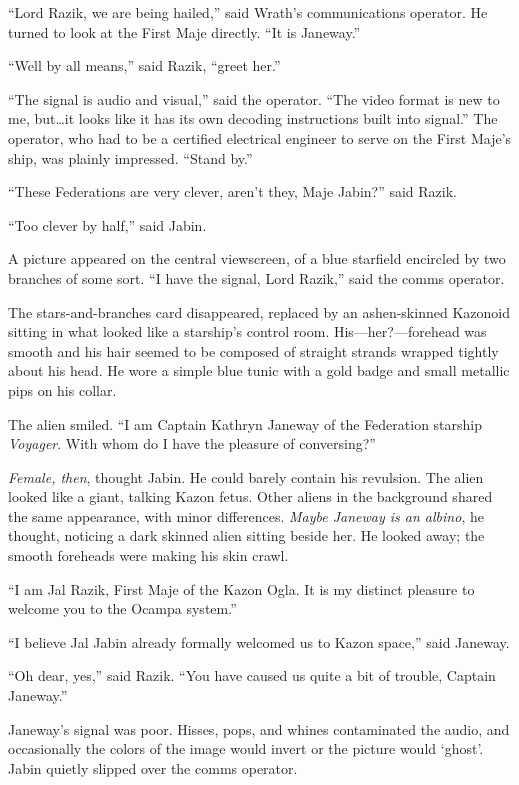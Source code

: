 \documentclass[twoside,letterpaper,12pt]{memoir}
\begin{document}
``Lord Razik, we are being hailed,'' said Wrath's communications operator. He turned to look at the First Maje directly. ``It is Janeway.''

``Well by all means,'' said Razik, ``greet her.''

``The signal is audio and visual,'' said the operator. ``The video format is new to me, but\ldots it looks like it has its own decoding instructions built into signal.'' The operator, who had to be a certified electrical engineer to serve on the First Maje's ship, was plainly impressed. ``Stand by.''

``These Federations are very clever, aren't they, Maje Jabin?'' said Razik.

``Too clever by half,'' said Jabin.

A picture appeared on the central viewscreen, of a blue starfield encircled by two branches of some sort. ``I have the signal, Lord Razik,'' said the comms operator.

The stars-and-branches card disappeared, replaced by an ashen-skinned Kazonoid sitting in what looked like a starship's control room. His---her?---forehead was smooth and his hair seemed to be composed of straight strands wrapped tightly about his head. He wore a simple blue tunic with a gold badge and small metallic pips on his collar.

The alien smiled. ``I am Captain Kathryn Janeway of the Federation starship \textit{Voyager}. With whom do I have the pleasure of conversing?''

\textit{Female, then}, thought Jabin. He could barely contain his revulsion. The alien looked like a giant, talking Kazon fetus. Other aliens in the background shared the same appearance, with minor differences. \textit{Maybe Janeway is an albino}, he thought, noticing a dark skinned alien sitting beside her. He looked away; the smooth foreheads were making his skin crawl.

``I am Jal Razik, First Maje of the Kazon Ogla. It is my distinct pleasure to welcome you to the Ocampa system.''

``I believe Jal Jabin already formally welcomed us to Kazon space,'' said Janeway.

``Oh dear, yes,'' said Razik. ``You have caused us quite a bit of trouble, Captain Janeway.''

Janeway's signal was poor. Hisses, pops, and whines contaminated the audio, and occasionally the colors of the image would invert or the picture would `ghost'. Jabin quietly slipped over the comms operator.
\end{document}
